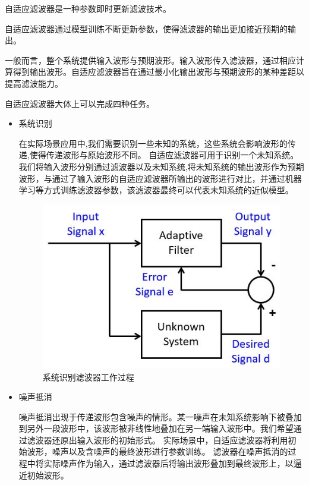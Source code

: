 自适应滤波器是一种参数即时更新滤波技术。

自适应滤波器通过模型训练不断更新参数，使得滤波器的输出更加接近预期的输出。

一般而言，整个系统提供输入波形与预期波形。输入波形传入滤波器，通过相应计算得到输出波形。自适应滤波器旨在通过最小化输出波形与预期波形的某种差距以提高滤波能力。

自适应滤波器大体上可以完成四种任务。

\begin{itemize}
    \item 系统识别

          在实际场景应用中,我们需要识别一些未知的系统，这些系统会影响波形的传递,使得传递波形与原始波形不同。
          自适应滤波器可用于识别一个未知系统。我们将输入波形分别通过滤波器以及未知系统,将未知系统的输出波形作为预期波形，与通过了输入波形的自适应滤波器所输出的波形进行对比，并通过机器学习等方式训练滤波器参数，该滤波器最终可以代表未知系统的近似模型。

          \begin{center}
              \begin{figure}[ht!]
                  \centering
                  \includegraphics[scale=0.5]{figures/sec2systemid.jpg}
                  \caption{系统识别滤波器工作过程}
                  \label{fig:systemID}
              \end{figure}
          \end{center}

    \item 噪声抵消

          噪声抵消出现于传递波形包含噪声的情形。某一噪声在未知系统影响下被叠加到另外一段波形中，该波形被非线性地叠加在另一端输入波形中。我们希望通过滤波器还原出输入波形的初始形式。
          实际场景中，自适应滤波器将利用初始波形，噪声以及含噪声的最终波形进行参数训练。
          滤波器在噪声抵消的过程中将实际噪声作为输入，通过滤波器后将输出波形叠加到最终波形上，以逼近初始波形。


\end{itemize}
